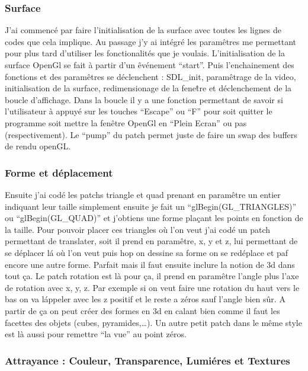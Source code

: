 \subsubsection{Surface}

J'ai commenc\'e par faire l'initialisation de la surface avec toutes les 
lignes de codes que cela implique. Au passage j'y ai int\'egr\'e les 
param\^etres me permettant pour plus tard d'utiliser les fonctionalit\'es 
que je voulais. L'initialisation de la surface OpenGl se fait \`a partir 
d'un \^ev\'enement ``start''. Puis l'enchainement des fonctions et des
 param\^etres se d\'eclenchent : SDL\_init, param\^etrage de la video,
 initialisation de la surface, redimensionage de la fene\^tre et
 d\'eclenchement 
de la boucle d'affichage. Dans la boucle il y a une fonction 
permettant de savoir si l'utilisateur \`a appuy\'e sur les touches ``Escape'' 
ou ``F'' pour soit quitter le programme soit mettre la fen\^etre OpenGl 
en ``Plein Ecran'' ou pas (respectivement). Le ``pump'' du patch permet 
juste de faire un swap des buffers de rendu openGL.

\subsubsection{Forme et d\'eplacement}
Ensuite j'ai cod\'e les patchs triangle et quad prenant en param\^etre un 
entier indiquant leur taille simplement ensuite je fait un
``glBegin(GL\_TRIANGLES)'' ou ``glBegin(GL\_QUAD)'' et
j'obtiens une forme pla\c{c}ant les points en fonction
de la taille. Pour pouvoir placer ces triangles o\`u l'on veut j'ai cod\'e un
patch permettant de translater, soit il prend en param\^etre, x, y et z, lui
permettant de se d\'eplacer l\'a o\`u l'on veut puis hop on dessine sa forme
on se red\'eplace et paf encore une autre forme. Parfait mais il faut ensuite 
inclure la notion de 3d dans tout \c{c}a.
Le patch rotation est l\`a pour \c{c}a,
il prend en param\^etre l'angle plus l'axe de rotation
avec x, y, z. Par exemple
si on veut faire une rotation du  haut vers le bas on va l\'appeler avec les z
positif et le reste  a z\'eros sauf l'angle bien s\^ur. A partir de \c{c}a on
peut cr\'eer des formes en 3d en calant bien comme il faut les facettes des
objets (cubes, pyramides,\ldots). Un autre petit patch dans le m\^eme style
est l\`a aussi pour remettre ``la vue'' au point z\'eros.


\subsubsection{Attrayance : Couleur, Transparence, Lumi\'eres et Textures}

